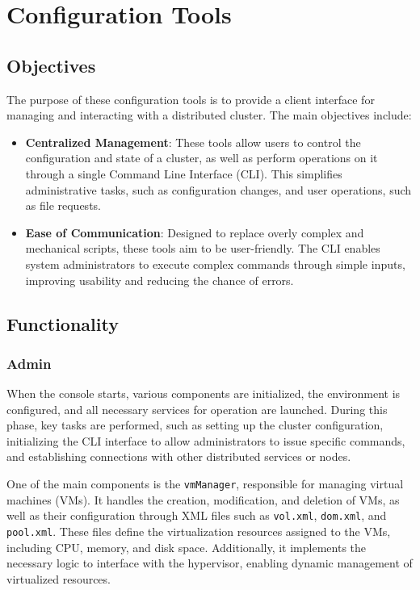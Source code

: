 \section{Configuration Tools}
\subsection{Objectives}
The purpose of these configuration tools is to provide a client interface for 
managing and interacting with a distributed cluster. The main objectives include:

\begin{itemize}
  \item \textbf{Centralized Management}: These tools allow users to control 
    the configuration and state of a cluster, as well as perform operations 
    on it through a single Command Line Interface (CLI). This simplifies 
    administrative tasks, such as configuration changes, and user operations,
    such as file requests.
  \item \textbf{Ease of Communication}: Designed to replace overly complex and 
    mechanical scripts, these tools aim to be user-friendly. The CLI enables 
    system administrators to execute complex commands through simple inputs, 
    improving usability and reducing the chance of errors.
\end{itemize}

\subsection{Functionality}
\subsubsection{Admin}
When the console starts, various components are initialized, the environment 
is configured, and all necessary services for operation are launched. During 
this phase, key tasks are performed, such as setting up the cluster 
configuration, initializing the CLI interface to allow administrators to issue 
specific commands, and establishing connections with other distributed 
services or nodes.

One of the main components is the \texttt{vmManager}, responsible for managing 
virtual machines (VMs). It handles the creation, modification, and deletion of 
VMs, as well as their configuration through XML files such as \texttt{vol.xml}, 
\texttt{dom.xml}, and \texttt{pool.xml}. These files define the virtualization 
resources assigned to the VMs, including CPU, memory, and disk space. 
Additionally, it implements the necessary logic to interface with the 
hypervisor, enabling dynamic management of virtualized resources.

